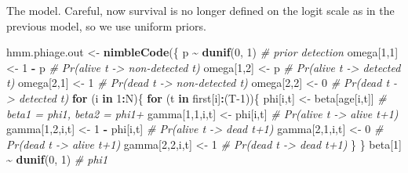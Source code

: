 \documentclass[
  12pt,
]{krantz}
\newenvironment{Shaded}{\begin{snugshade}}{\end{snugshade}}
\newcommand{\CommentTok}[1]{\textcolor[rgb]{0.56,0.35,0.01}{\textit{#1}}}
\newcommand{\ControlFlowTok}[1]{\textcolor[rgb]{0.13,0.29,0.53}{\textbf{#1}}}
\newcommand{\DecValTok}[1]{\textcolor[rgb]{0.00,0.00,0.81}{#1}}
\newcommand{\FunctionTok}[1]{\textcolor[rgb]{0.13,0.29,0.53}{\textbf{#1}}}
\newcommand{\NormalTok}[1]{#1}
\newcommand{\OtherTok}[1]{\textcolor[rgb]{0.56,0.35,0.01}{#1}}
\newcommand{\SpecialCharTok}[1]{\textcolor[rgb]{0.81,0.36,0.00}{\textbf{#1}}}
\begin{document}
The model. Careful, now survival is no longer defined on the logit scale as in the previous model, so we use uniform priors.

\begin{Shaded}
\begin{Highlighting}[]
\NormalTok{hmm.phiage.out }\OtherTok{\textless{}{-}} \FunctionTok{nimbleCode}\NormalTok{(\{}
\NormalTok{  p }\SpecialCharTok{\textasciitilde{}} \FunctionTok{dunif}\NormalTok{(}\DecValTok{0}\NormalTok{, }\DecValTok{1}\NormalTok{) }\CommentTok{\# prior detection}
\NormalTok{  omega[}\DecValTok{1}\NormalTok{,}\DecValTok{1}\NormalTok{] }\OtherTok{\textless{}{-}} \DecValTok{1} \SpecialCharTok{{-}}\NormalTok{ p    }\CommentTok{\# Pr(alive t {-}\textgreater{} non{-}detected t)}
\NormalTok{  omega[}\DecValTok{1}\NormalTok{,}\DecValTok{2}\NormalTok{] }\OtherTok{\textless{}{-}}\NormalTok{ p        }\CommentTok{\# Pr(alive t {-}\textgreater{} detected t)}
\NormalTok{  omega[}\DecValTok{2}\NormalTok{,}\DecValTok{1}\NormalTok{] }\OtherTok{\textless{}{-}} \DecValTok{1}        \CommentTok{\# Pr(dead t {-}\textgreater{} non{-}detected t)}
\NormalTok{  omega[}\DecValTok{2}\NormalTok{,}\DecValTok{2}\NormalTok{] }\OtherTok{\textless{}{-}} \DecValTok{0}        \CommentTok{\# Pr(dead t {-}\textgreater{} detected t)}
  \ControlFlowTok{for}\NormalTok{ (i }\ControlFlowTok{in} \DecValTok{1}\SpecialCharTok{:}\NormalTok{N)\{}
    \ControlFlowTok{for}\NormalTok{ (t }\ControlFlowTok{in}\NormalTok{ first[i]}\SpecialCharTok{:}\NormalTok{(T}\DecValTok{{-}1}\NormalTok{))\{}
\NormalTok{    phi[i,t] }\OtherTok{\textless{}{-}}\NormalTok{ beta[age[i,t]] }\CommentTok{\# beta1 = phi1, beta2 = phi1+}
\NormalTok{    gamma[}\DecValTok{1}\NormalTok{,}\DecValTok{1}\NormalTok{,i,t] }\OtherTok{\textless{}{-}}\NormalTok{ phi[i,t]      }\CommentTok{\# Pr(alive t {-}\textgreater{} alive t+1)}
\NormalTok{    gamma[}\DecValTok{1}\NormalTok{,}\DecValTok{2}\NormalTok{,i,t] }\OtherTok{\textless{}{-}} \DecValTok{1} \SpecialCharTok{{-}}\NormalTok{ phi[i,t]  }\CommentTok{\# Pr(alive t {-}\textgreater{} dead t+1)}
\NormalTok{    gamma[}\DecValTok{2}\NormalTok{,}\DecValTok{1}\NormalTok{,i,t] }\OtherTok{\textless{}{-}} \DecValTok{0}           \CommentTok{\# Pr(dead t {-}\textgreater{} alive t+1)}
\NormalTok{    gamma[}\DecValTok{2}\NormalTok{,}\DecValTok{2}\NormalTok{,i,t] }\OtherTok{\textless{}{-}} \DecValTok{1}           \CommentTok{\# Pr(dead t {-}\textgreater{} dead t+1)}
\NormalTok{    \}}
\NormalTok{  \}}
\NormalTok{  beta[}\DecValTok{1}\NormalTok{] }\SpecialCharTok{\textasciitilde{}} \FunctionTok{dunif}\NormalTok{(}\DecValTok{0}\NormalTok{, }\DecValTok{1}\NormalTok{) }\CommentTok{\# phi1}

\end{Highlighting}
\end{Shaded}
\end{document}
